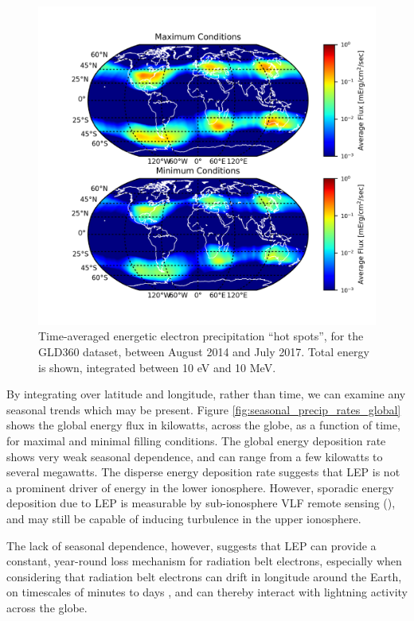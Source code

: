 \begin{figure}[]
\begin{center}
\includegraphics{figures/global_precip_map_max_min.png}
\caption[Global energy deposition ``hot spots'' for maximal and minimal radiation belt populations]{Time-averaged energetic electron precipitation ``hot spots'', for the GLD360 dataset, between August 2014 and July 2017. Total energy is shown, integrated between 10 eV and 10 MeV. }
\label{fig:global_precip_map_max_min}
\end{center}
\end{figure}

By integrating over latitude and longitude, rather than time, we can examine any seasonal trends which may be present. Figure \ref{fig:seasonal_precip_rates_global} shows the global energy flux in kilowatts, across the globe, as a function of time, for maximal and minimal filling conditions. The global energy deposition rate shows very weak seasonal dependence, and can range from a few kilowatts to several megawatts. The disperse energy deposition rate suggests that LEP is not a prominent driver of energy in the lower ionosphere. However, sporadic energy deposition due to LEP is measurable by sub-ionosphere VLF remote sensing (\cite{AN IONOSPHERE PAPER HERE}), and may still be capable of inducing turbulence in the upper ionosphere.

The lack of seasonal dependence, however, suggests that LEP can provide a constant, year-round loss mechanism for radiation belt electrons, especially when considering that radiation belt electrons can drift in longitude around the Earth, on timescales of minutes to days \citep{Walt1994}, and can thereby interact with lightning activity across the globe.

